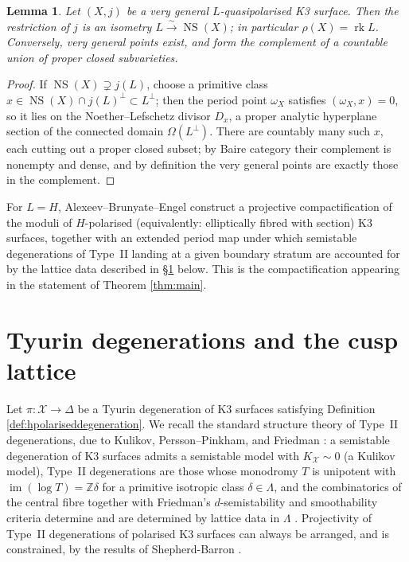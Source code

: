 \documentclass[11pt]{amsart}
\theoremstyle{plain}
\newtheorem{lemma}[theorem]{Lemma}
\theoremstyle{definition}
\newcommand{\Z}{\mathbb{Z}}
\newcommand{\NS}{\operatorname{NS}}
\newcommand{\Lam}{\Lambda}
\newcommand{\cX}{\mathcal{X}}
\begin{document}
\begin{lemma}\label{lem:verygeneralNS}
Let $(X,j)$ be a very general $L$-quasipolarised K3 surface. Then the
restriction of $j$ is an isometry $L\stackrel{\sim}{\to}\NS(X)$; in particular
$\rho(X)=\operatorname{rk}L$. Conversely, very general points exist, and form
the complement of a countable union of proper closed subvarieties.
\end{lemma}

\begin{proof}
If $\NS(X)\supsetneq j(L)$, choose a primitive class
$x\in \NS(X)\cap j(L)^\perp\subset L^\perp$; then the period point
$\omega_X$ satisfies $(\omega_X,x)=0$, so it lies on the Noether--Lefschetz
divisor $D_x$, a proper analytic hyperplane section of the connected domain
$\Omega(L^\perp)$. There are countably many such $x$, each cutting out a proper
closed subset; by Baire category their complement is nonempty and dense, and
by definition the very general points are exactly those in the complement.
\end{proof}

For $L=H$, Alexeev--Brunyate--Engel \cite{cmek3sspt} construct a projective
compactification of the moduli of $H$-polarised (equivalently: elliptically
fibred with section) K3 surfaces, together with an extended period map under
which semistable degenerations of Type~II landing at a given boundary stratum
are accounted for by the lattice data described in \S\ref{sec:cusp} below. This
is the compactification appearing in the statement of Theorem \ref{thm:main}.

\section{Tyurin degenerations and the cusp lattice}\label{sec:cusp}

Let $\pi\colon\cX\to\Delta$ be a Tyurin degeneration of K3 surfaces satisfying
Definition \ref{def:hpolariseddegeneration}. We recall the standard structure
theory of Type~II degenerations, due to Kulikov, Persson--Pinkham, and Friedman
\cite{Kul77,PP81,Fri83}: a semistable degeneration of K3 surfaces admits a
semistable model with $K_{\cX}\sim 0$ (a Kulikov model), Type~II degenerations
are those whose monodromy $T$ is unipotent with
$\operatorname{im}(\log T)=\Z\delta$ for a primitive isotropic class
$\delta\in\Lam$, and the combinatorics of the central fibre together with
Friedman's $d$-semistability and smoothability criteria determine and are
determined by lattice data in $\Lam$ \cite{Fri83}. Projectivity of Type~II
degenerations of polarised K3 surfaces can always be arranged, and is
constrained, by the results of Shepherd-Barron \cite{SB83}.
\end{document}

